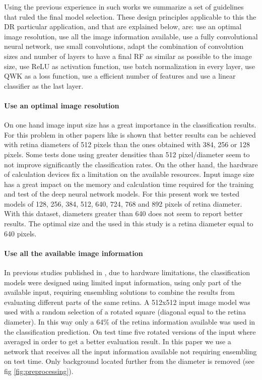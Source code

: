 \documentclass[review]{elsarticle}
\theoremstyle{definition} %
\theoremstyle{remark}
\begin{document}
Using the previous experience in such works we summarize a set of guidelines that ruled the final model selection. These design principles applicable to this the DR particular application, and that are explained below, are: use an optimal image resolution, use all the image information available, use a fully convolutional neural network, use small convolutions, adapt the combination of convolution sizes and number of layers to have a final RF as similar as possible to the image size, use ReLU as activation function, use batch normalization in every layer, use QWK as a loss function, use a efficient number of features and use a linear classifier as the last layer.

\paragraph{Use an optimal image resolution} On one hand image input size has a great importance in the classification results. For this problem in other papers like \cite{jdelatorre-2016} is shown that better results can be achieved with retina diameters of 512 pixels than the ones obtained with 384, 256 or 128 pixels. Some tests done using greater densities than 512 pixel/diameter seem to not improve significantly the classification rates. On the other hand, the hardware of calculation devices fix a limitation on the available resources. Input image size has a great impact on the memory and calculation time required for the training and test of the deep neural network models. For this present work we tested models of 128, 256, 384, 512, 640, 724, 768 and 892 pixels of retina diameter. With this dataset, diameters greater than 640 does not seem to report better results. The optimal size and the used in this study is a retina diameter equal to 640 pixels.

\paragraph{Use all the available image information} In previous studies published in \cite{jdelatorre-2016}, due to hardware limitations, the classification models were designed using limited input information, using only part of the available input, requiring ensembling solutions to combine the results from evaluating different parts of the same retina. A 512x512 input image model was used with a random selection of a rotated square (diagonal equal to the retina diameter). In this way only a 64\% of the retina information available was used in the classification prediction. On test time five rotated versions of the input where averaged in order to get a better evaluation result. In this paper we use a network that receives all the input information available not requiring ensembling on test time. Only background located further from the diameter is removed (see fig \ref{fig:preprocessing}).
\end{document}
